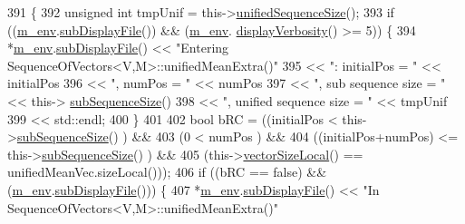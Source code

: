 \begin{DoxyCode}
391 \{
392   \textcolor{keywordtype}{unsigned} \textcolor{keywordtype}{int} tmpUnif = this->\hyperlink{class_q_u_e_s_o_1_1_base_vector_sequence_a188dc4632db5b93c01e8bc69bf631f4a}{unifiedSequenceSize}();
393   \textcolor{keywordflow}{if} ((\hyperlink{class_q_u_e_s_o_1_1_base_vector_sequence_a8e8824d2a63c5a43bcc6473e3a0491e8}{m\_env}.\hyperlink{class_q_u_e_s_o_1_1_base_environment_a8a0064746ae8dddfece4229b9ad374d6}{subDisplayFile}()) && (\hyperlink{class_q_u_e_s_o_1_1_base_vector_sequence_a8e8824d2a63c5a43bcc6473e3a0491e8}{m\_env}.
      \hyperlink{class_q_u_e_s_o_1_1_base_environment_a1fe5f244fc0316a0ab3e37463f108b96}{displayVerbosity}() >= 5)) \{
394     *\hyperlink{class_q_u_e_s_o_1_1_base_vector_sequence_a8e8824d2a63c5a43bcc6473e3a0491e8}{m\_env}.\hyperlink{class_q_u_e_s_o_1_1_base_environment_a8a0064746ae8dddfece4229b9ad374d6}{subDisplayFile}() << \textcolor{stringliteral}{"Entering SequenceOfVectors<V,M>::unifiedMeanExtra()"}
395                             << \textcolor{stringliteral}{": initialPos = "}            << initialPos
396                             << \textcolor{stringliteral}{", numPos = "}                << numPos
397                             << \textcolor{stringliteral}{", sub sequence size = "}     << this->
      \hyperlink{class_q_u_e_s_o_1_1_sequence_of_vectors_a0224bd3e961d86af5d2886301c0c2b86}{subSequenceSize}()
398                             << \textcolor{stringliteral}{", unified sequence size = "} << tmpUnif
399                             << std::endl;
400   \}
401 
402   \textcolor{keywordtype}{bool} bRC = ((initialPos              <  this->\hyperlink{class_q_u_e_s_o_1_1_sequence_of_vectors_a0224bd3e961d86af5d2886301c0c2b86}{subSequenceSize}()   ) &&
403               (0                       <  numPos                    ) &&
404               ((initialPos+numPos)     <= this->\hyperlink{class_q_u_e_s_o_1_1_sequence_of_vectors_a0224bd3e961d86af5d2886301c0c2b86}{subSequenceSize}()   ) &&
405               (this->\hyperlink{class_q_u_e_s_o_1_1_base_vector_sequence_a2fefedf9e5b90f22881103b3f92555f6}{vectorSizeLocal}() == unifiedMeanVec.sizeLocal()));
406   \textcolor{keywordflow}{if} ((bRC == \textcolor{keyword}{false}) && (\hyperlink{class_q_u_e_s_o_1_1_base_vector_sequence_a8e8824d2a63c5a43bcc6473e3a0491e8}{m\_env}.\hyperlink{class_q_u_e_s_o_1_1_base_environment_a8a0064746ae8dddfece4229b9ad374d6}{subDisplayFile}())) \{
407     *\hyperlink{class_q_u_e_s_o_1_1_base_vector_sequence_a8e8824d2a63c5a43bcc6473e3a0491e8}{m\_env}.\hyperlink{class_q_u_e_s_o_1_1_base_environment_a8a0064746ae8dddfece4229b9ad374d6}{subDisplayFile}() << \textcolor{stringliteral}{"In SequenceOfVectors<V,M>::unifiedMeanExtra()"}

\end{DoxyCode}
